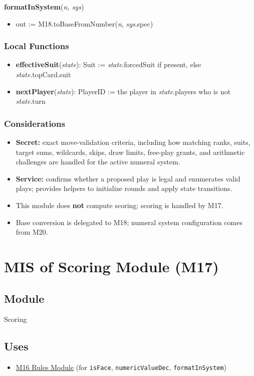 \documentclass[12pt, titlepage]{article}
\begin{document}
\noindent\textbf{formatInSystem}(\textit{n, sys})
\begin{itemize}
    \item out := M18.toBaseFromNumber(\textit{n}, \textit{sys}.spec)
\end{itemize}

\subsubsection{Local Functions}
\begin{itemize}
    \item \textbf{effectiveSuit}(\textit{state}): Suit := \textit{state}.forcedSuit if present, else \textit{state}.topCard.suit
    \item \textbf{nextPlayer}(\textit{state}): PlayerID := the player in \textit{state}.players who is not \textit{state}.turn
\end{itemize}

\subsubsection{Considerations}
\begin{itemize}
    \item \textbf{Secret:} exact move-validation criteria, including how matching ranks, suits, target sums, wildcards, skips, draw limits, free-play grants, and arithmetic challenges are handled for the active numeral system.
    \item \textbf{Service:} confirms whether a proposed play is legal and enumerates valid plays; provides helpers to initialize rounds and apply state transitions.
    \item This module does \textbf{not} compute scoring; scoring is handled by M17.
    \item Base conversion is delegated to M18; numeral system configuration comes from M20.
\end{itemize}

\newpage
\section{MIS of Scoring Module (M17)}\label{sec:scoring-module}

\subsection{Module}
Scoring

\subsection{Uses}
\begin{itemize}
    \item \hyperref[sec:rules-module]{M16 Rules Module} (for \texttt{isFace}, \texttt{numericValueDec}, \texttt{formatInSystem})
\end{itemize}
\end{document}
